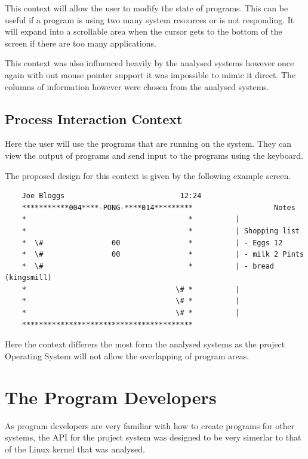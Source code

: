 \documentclass[a4paper]{report}
\begin{document}
This context will allow the user to modify the state of programs. This can be useful if a program is using two many system resources or is not responding. It will expand into a scrollable area when the cursor gets to the bottom of the screen if there are too many applications.

This context was also influenced heavily by the analysed systems however once again with out mouse pointer support it was impossible to mimic it direct. The columns of information however were chosen from the analysed systems.

\subsection{Process Interaction Context}

Here the user will use the programs that are running on the system. They can view the output of programs and send input to the programs using the keyboard.

The proposed design for this context is given by the following example screen.

{\ttfamily \small
  \begin{framed}
    \begin{verbatim}
    Joe Bloggs                           12:24
    ***********004****-PONG-****014*********                   Notes
    *                                      *          |
    *                                      *          | Shopping list
    *  \#                00                *          | - Eggs 12
    *  \#                00                *          | - milk 2 Pints
    *  \#                                  *          | - bread (kingsmill)
    *                                   \# *          |
    *                                   \# *          |
    *                                   \# *          |
    ****************************************
    \end{verbatim}
  \end{framed}
}

Here the context differers the most form the analysed systems as the project Operating System will not allow the overlapping of program areas.



\section{The Program Developers}

As program developers are very familiar with how to create programs for other systems, the API for the project system was designed to be very simerlar to that of the Linux kernel that was analysed.
\end{document}

